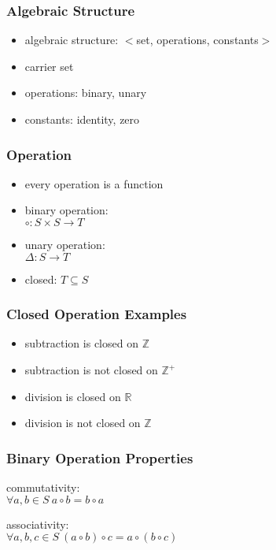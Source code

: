 \documentclass[dvipsnames]{beamer}
\begin{document}
\begin{frame}
  \frametitle{Algebraic Structure}

  \begin{itemize}
    \item \alert{algebraic structure}: $<$set, operations, constants$>$

    \bigskip
    \item carrier set
    \item operations: binary, unary
    \item constants: identity, zero
  \end{itemize}
\end{frame}

\begin{frame}
  \frametitle{Operation}

  \begin{itemize}
    \item every operation is a function

    \medskip
    \item binary operation:\\
      $\circ: S \times S \rightarrow T$

    \medskip
    \item unary operation:\\
      $\Delta: S \rightarrow T$

    \pause
    \medskip
    \item \alert{closed}: $T \subseteq S$
  \end{itemize}
\end{frame}

\begin{frame}
  \frametitle{Closed Operation Examples}

  \begin{example}
    \begin{itemize}
      \item subtraction is closed on $\mathbb{Z}$
      \item subtraction is not closed on $\mathbb{Z^+}$

      \pause
      \medskip
      \item division is closed on $\mathbb{R}$
      \item division is not closed on $\mathbb{Z}$
    \end{itemize}
  \end{example}
\end{frame}

\begin{frame}
  \frametitle{Binary Operation Properties}

  \begin{definition}
    \alert{commutativity}:\\
    $\forall a,b \in S~a \circ b = b \circ a$
  \end{definition}

  \begin{definition}
    \alert{associativity}:\\
    $\forall a,b,c \in S~(a \circ b) \circ c = a \circ (b \circ c)$
  \end{definition}
\end{frame}
\end{document}

